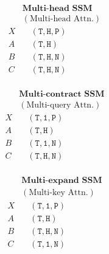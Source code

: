 \begin{minipage}[t]{.25\linewidth}
  \begin{equation}%
    \label{eq:multihead}
    \begin{aligned}%
        & \textbf{Multi-head SSM} \\
        & (\textrm{Multi-head Attn.}) \\
      X & \quad \mathtt{(T, H, P)} \\
      A & \quad \mathtt{(T, H)} \\
      B & \quad \mathtt{(T, H, N)} \\
      C & \quad \mathtt{(T, H, N)} \\
    \end{aligned}
  \end{equation}
\end{minipage}
\begin{minipage}[t]{.25\linewidth}
  \begin{equation}%
    \label{eq:multiquery}
    \begin{aligned}%
    & \textbf{Multi-contract SSM} \\
    & (\textrm{Multi-query Attn.}) \\
      X & \quad \mathtt{(T, 1, P)} \\
      A & \quad \mathtt{(T, H)} \\
      B & \quad \mathtt{(T, 1, N)} \\
      C & \quad \mathtt{(T, H, N)} \\
    \end{aligned}
  \end{equation}
\end{minipage}
\begin{minipage}[t]{.25\linewidth}
  \begin{equation}%
    \label{eq:multikey}
    \begin{aligned}%
    & \textbf{Multi-expand SSM} \\
    & (\textrm{Multi-key Attn.}) \\
      X & \quad \mathtt{(T, 1, P)} \\
      A & \quad \mathtt{(T, H)} \\
      B & \quad \mathtt{(T, H, N)} \\
      C & \quad \mathtt{(T, 1, N)} \\
    \end{aligned}
  \end{equation}
\end{minipage}
